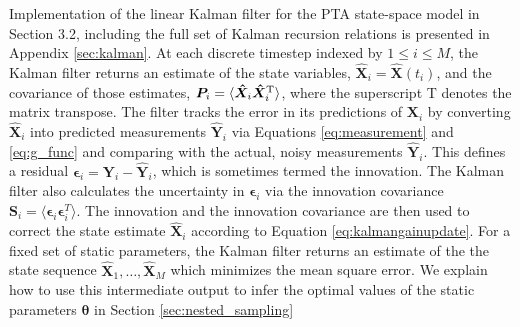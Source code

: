 \documentclass[fleqn,usenatbib,useAMS]{mnras}
\begin{document}
Implementation of the linear Kalman filter for the PTA state-space model in Section 3.2, including the full set of Kalman recursion relations is presented in Appendix \ref{sec:kalman}. At each discrete timestep indexed by $ 1 \leq i  \leq M$, the Kalman filter returns an estimate of the state variables, $\hat{\boldsymbol{X}}_i = \hat{\boldsymbol{X}}(t_i)$, and the covariance of those estimates, ${\boldsymbol{P}}_i = \langle {\boldsymbol{\hat X}}_i {\boldsymbol{\hat X}}_i^{\rm T} \rangle$, where the superscript T denotes the matrix transpose. The filter tracks the error in its predictions of $\boldsymbol{X}_i$ by converting ${\boldsymbol{\hat X}}_i$ into predicted measurements ${\boldsymbol{\hat Y}}_i$ via Equations \eqref{eq:measurement} and \eqref{eq:g_func} and comparing with the actual, noisy measurements ${\boldsymbol{\hat Y}}_i$. This defines a residual $\boldsymbol{\epsilon}_i = \boldsymbol{Y}_i  - \hat{\boldsymbol{Y}}_i$, which is sometimes termed the innovation. The Kalman filter also calculates the uncertainty in $\boldsymbol{\epsilon}_i$ via the innovation covariance $\boldsymbol{S}_i = \langle \boldsymbol{\epsilon}_i \boldsymbol{\epsilon}_i^{T} \rangle$. The innovation and the innovation covariance are then used to correct the state estimate ${\boldsymbol{\hat X}}_i$ according to Equation \eqref{eq:kalmangainupdate}. For a fixed set of static parameters, the Kalman filter returns an estimate of the the state sequence ${\boldsymbol {\hat X}}_1, \dots , {\boldsymbol{\hat X}}_M$ which minimizes the mean square error. We explain how to use this intermediate output to infer the optimal values of the static parameters ${\boldsymbol{\theta}}$ in Section \ref{sec:nested_sampling} \newline 
\end{document}
